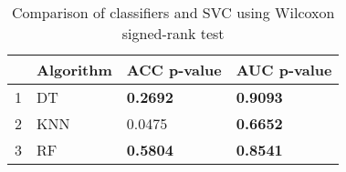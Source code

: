 \begin{table}
\footnotesize
\caption{Comparison of classifiers and SVC using Wilcoxon signed-rank test}
\label{tab:wilcoxon comparison}
\begin{tabular}{llll}
\hline
 & Algorithm & ACC p-value & AUC p-value \\
\hline
1 & DT & \textbf{0.2692} & \textbf{0.9093} \\
2 & KNN & 0.0475 & \textbf{0.6652} \\
3 & RF & \textbf{0.5804} & \textbf{0.8541} \\
\hline
\end{tabular}
\end{table}
